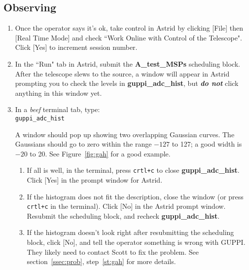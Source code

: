\documentclass[11pt]{article}
\begin{document}
\subsection{Observing}\label{ssec:qb}  %
\begin{enumerate}
 \item Once the operator says it's ok, take control in Astrid by clicking [File] then [Real Time Mode] and check ``Work Online with Control of the Telescope". Click [Yes] to increment session number. %
 \item In the ``Run" tab in Astrid, submit the \textbf{A\_test\_MSPs} scheduling block.  \\ %
 After the telescope slews to the source, a window will appear in Astrid prompting you to check the levels in \textbf{guppi\_adc\_hist}, but \textbf{\textit{do not}} click anything in this window yet.
 \item \label{st:adc1} In a \textit{beef} terminal tab, type: \\ %
 \texttt{guppi\_adc\_hist}

 A window should pop up showing two overlapping Gaussian curves. The Gaussians should go to zero within the range $-127$ to 127; a good width is $-20$ to 20. 
 See Figure~\ref{fig:gah} for a good example. \begin{enumerate}
  \item If all is well, in the terminal, press \texttt{crtl+c} to close \textbf{guppi\_adc\_hist}.  Click [Yes] in the prompt window for Astrid.  %
  \item If the histogram does not fit the description, close the window (or press \texttt{crtl+c} in the terminal).  Click [No] in the Astrid prompt window.  Resubmit the scheduling block, and recheck \textbf{guppi\_adc\_hist}. %
  \item If the histogram doesn't look right after resubmitting the scheduling block, click [No], and tell the operator something is wrong with GUPPI.  They likely need to contact Scott to fix the problem.  See section~\ref{ssec:prob}, step~\ref{st:gah} for more details. %
 \end{enumerate}


\end{enumerate}
\end{document}
